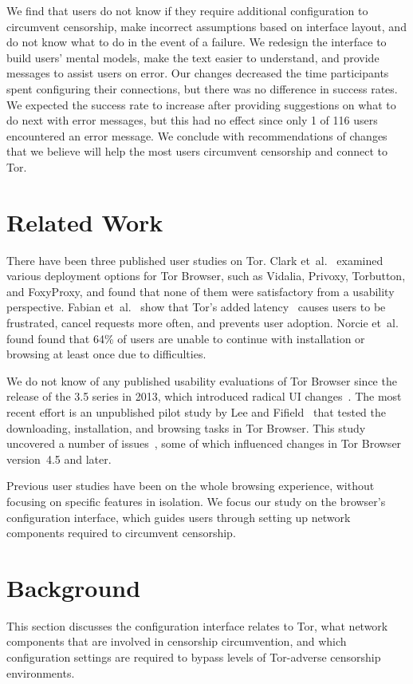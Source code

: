 \documentclass[USenglish,oneside,twocolumn]{article}
\begin{document}
We find that users do not know if they require additional configuration to circumvent censorship, make incorrect assumptions based on interface layout, and do not know what to do in the event of a failure. We redesign the interface to build users' mental models, make the text easier to understand, and provide messages to assist users on error. Our changes decreased the time participants spent configuring their connections, but there was no difference in success rates. We expected the success rate to increase after providing suggestions on what to do next with error messages, but this had no effect since only 1 of 116 users encountered an error message. We conclude with recommendations of changes that we believe will help the most users circumvent censorship and connect to Tor. 

\section{Related Work} 
There have been three published user studies on Tor. Clark et~al.~\cite{clark2007usability} examined various deployment
options for Tor Browser, such as Vidalia, Privoxy, Torbutton, and FoxyProxy, and found that none of them 
were satisfactory from a usability perspective. Fabian et~al.~\cite{fabian2010privately} show that Tor's added
latency~\cite{dingledine2009performance} causes users
to be frustrated, cancel requests more often, and prevents user adoption. 
Norcie et~al.~\cite{norcie2012eliminating} found found that 
64\% of users are unable to continue with installation or browsing at least once due to difficulties.

We do not know of any published usability evaluations of
Tor Browser since the release of the 3.5 series in 2013, which introduced radical UI changes~\cite{torbrowser-35}.
The most recent effort is an unpublished pilot study by Lee and Fifield~\cite{uxsprint} 
that tested the downloading, installation, and browsing tasks in Tor Browser.  This study uncovered a number of issues~\cite{uxsprint2015-tickets},
some of which influenced changes in Tor Browser version~4.5 and later.

Previous user studies have been on the whole browsing experience,
without focusing on specific features in isolation.
We focus our study on 
the browser's configuration interface, which guides users through setting up network components required to circumvent censorship. 

\section{Background}
This section discusses the configuration interface relates to Tor, what network components that are involved in censorship circumvention, and which configuration settings are required to bypass levels of Tor-adverse censorship environments. 
\end{document}
